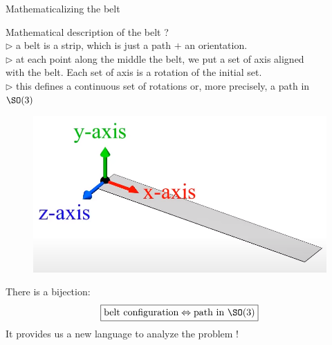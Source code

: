 \documentclass[9pt]{beamer}
\renewcommand{\emph}{\alert}
\begin{document}
\begin{frame}{Mathematicalizing the belt}

    Mathematical description of the belt ?\\[0.3cm]
    \quad $\triangleright$ a belt is a strip, which is just a \emph{path} $+$ an \emph{orientation}.\\[0.2cm]
    \quad $\triangleright$ at each point along the middle the belt, we put a set of axis aligned \\ \hspace{0.5cm} with the belt. Each set of axis is a rotation of the initial set. \\[0.2cm]
    \quad $\triangleright$ this defines a continuous set of rotations or, more precisely, a \emph{path in \\ \hspace{0.5cm} $\SO(3)$}
    \begin{figure}
        \centering
        \includegraphics[scale=0.12]{Pictures/beltaxis.png}
    \end{figure}
    There is a bijection:
    \begin{equation*}
        \boxed{\text{belt configuration} \Leftrightarrow \text{path in $\SO(3)$}}
    \end{equation*}
    It provides us a new language to analyze the problem !

\end{frame}
\end{document}
